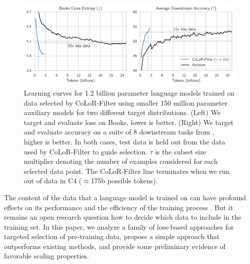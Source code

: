 \documentclass{article}
\begin{document}
\begin{figure}[t]
    \centering
    \includegraphics[width=\textwidth]{images/1b.pdf}
    \vspace{-0.2cm}
    \caption{Learning curves for 1.2 billion parameter language models trained on data selected by CoLoR-Filter using smaller 150 million parameter auxiliary models for two different target distributions. (Left) We target and evaluate loss on Books, lower is better. (Right) We target and evaluate accuracy on a suite of 8 downstream tasks from \citep{groeneveld2024olmo}, higher is better. In both cases, test data is held out from the data used by CoLoR-Filter to guide selection. $\tau$ is the subset size multiplier denoting the number of examples considered for each selected data point. The CoLoR-Filter line terminates when we run out of data in C4 ($\approx$175b possible tokens).}
    \label{fig:1b}
\end{figure}

The content of the data that a language model is trained on can have profound effects on its performance and the efficiency of the training process \citep{rae2021scaling, longpre2023pretrainer, penedo2023refinedweb, cerebras2023slimpajama, li2024datacomp}. But it remains an open research question how to decide which data to include in the training set.
In this paper, we analyze a family of loss-based approaches for targeted selection of pre-training data, propose a simple approach that outperforms existing methods, and provide some preliminary evidence of favorable scaling properties. 

\end{document}
